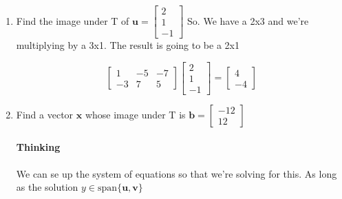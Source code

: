\documentclass{article}
\begin{document}
            \begin{enumerate}[label=(\alph*)]
                \item 
                    Find the image under T of $\mathbf{u}=\begin{bmatrix}2\\1\\-1\end{bmatrix}$
                    So. We have a 2x3 and we're multiplying by a 3x1. The result is going to be a 2x1
                    \begin{solutioncheck}
                        \[
                        \begin{bmatrix} 1 & -5 & -7 \\ -3 & 7 & 5 \end{bmatrix}
                        \begin{bmatrix}2\\1\\-1\end{bmatrix}
                        =
                        \begin{bmatrix}4\\-4\end{bmatrix}
                        \]
                    \end{solutioncheck}
                \item
                    Find a vector $\mathbf{x}$ whose image under
                    T is $\mathbf{b}=\begin{bmatrix}-12\\12\end{bmatrix}$
                    \paragraph{Thinking}
                        We can se up the system of equations so that we're solving for this.
                        As long as the solution $y\in\text{span}\{\mathbf{u},\mathbf{v}\}$

\end{enumerate}
\end{document}
